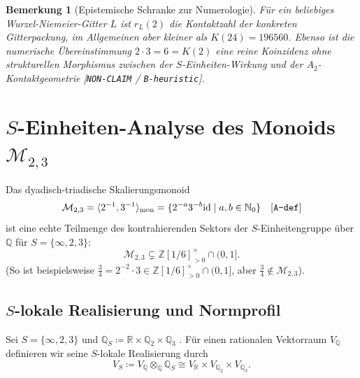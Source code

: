 \documentclass[11pt,a4paper]{article}
\newtheorem{remark}[theorem]{Bemerkung}
\newcommand{\id}{\mathrm{id}}
\begin{document}
	\begin{remark}[Epistemische Schranke zur Numerologie]
		Für ein beliebiges Wurzel-Niemeier-Gitter $L$ ist $r_L(2)$ die Kontaktzahl der konkreten Gitterpackung, im Allgemeinen aber kleiner als $K(24) = 196560$. Ebenso ist die numerische Übereinstimmung $2 \cdot 3 = 6 = K(2)$ eine reine Koinzidenz ohne strukturellen Morphismus zwischen der $S$-Einheiten-Wirkung und der $A_2$-Kontaktgeometrie [\texttt{NON-CLAIM} / \texttt{B-heuristic}].
	\end{remark}
	
	\section{$S$-Einheiten-Analyse des Monoids $\mathcal{M}_{2,3}$}
	
	Das dyadisch-triadische Skalierungsmonoid
	\begin{equation}
		\mathcal{M}_{2,3} = \langle 2^{-1}, 3^{-1} \rangle_{\mathrm{mon}} = \{2^{-a} 3^{-b} \id \mid a,b \in \mathbb{N}_0\} \quad [\text{\texttt{A-def}}]
	\end{equation}
	ist eine echte Teilmenge des kontrahierenden Sektors der $S$-Einheitengruppe über $\mathbb{Q}$ für $S = \{\infty, 2, 3\}$:
	\begin{equation}
		\mathcal{M}_{2,3} \subsetneq \mathbb{Z}[1/6]^\times_{>0} \cap (0,1].
	\end{equation}
	(So ist beispielsweise $\frac{3}{4} = 2^{-2} \cdot 3 \in \mathbb{Z}[1/6]^\times_{>0} \cap (0,1]$, aber $\frac{3}{4} \notin \mathcal{M}_{2,3}$).
	
	\subsection{$S$-lokale Realisierung und Normprofil}
	
	Sei $S=\{\infty,2,3\}$ und $\mathbb{Q}_S \coloneqq \mathbb{R} \times \mathbb{Q}_2 \times \mathbb{Q}_3$ \cite{weil}. Für einen rationalen Vektorraum $V_{\mathbb{Q}}$ definieren wir seine $S$-lokale Realisierung durch
	\begin{equation}
		V_S \coloneqq V_{\mathbb{Q}} \otimes_{\mathbb{Q}} \mathbb{Q}_S \cong V_{\mathbb{R}} \times V_{\mathbb{Q}_2} \times V_{\mathbb{Q}_3}.
	\end{equation}
	
\end{document}
